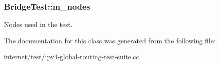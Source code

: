 \subsubsection[{\texorpdfstring{m\+\_\+nodes}{m_nodes}}]{ Bridge\+Test\+::m\+\_\+nodes\hspace{0.3cm}{\ttfamily [private]}}\hypertarget{classBridgeTest_af539673ded293faf900a2202eeb0dbb0}{}\label{classBridgeTest_af539673ded293faf900a2202eeb0dbb0}


Nodes used in the test. 



The documentation for this class was generated from the following file\+:\begin{DoxyCompactItemize}
\item 
internet/test/\hyperlink{ipv4-global-routing-test-suite_8cc}{ipv4-\/global-\/routing-\/test-\/suite.\+cc}\end{DoxyCompactItemize}
